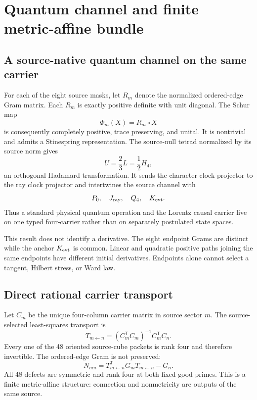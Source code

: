 \documentclass[11pt]{article}
\theoremstyle{definition}
\theoremstyle{remark}
\begin{document}
\section{Quantum channel and finite metric-affine bundle}

\subsection{A source-native quantum channel on the same carrier}

For each of the eight source masks, let $R_m$ denote the normalized ordered-edge Gram matrix. Each $R_m$ is exactly positive definite with unit diagonal. The Schur map
\begin{equation}\label{eq:schurchannel}
 \Phi_m(X)=R_m\circ X
\end{equation}
is consequently completely positive, trace preserving, and unital. It is nontrivial and admits a Stinespring representation. The source-null tetrad normalized by its source norm gives
\begin{equation}
 U=\frac23L=\frac12H_4,
\end{equation}
an orthogonal Hadamard transformation. It sends the character clock projector to the ray clock projector and intertwines the source channel with
\begin{equation}
 P_0,\quad J_{\rm ray},\quad Q_4,\quad K_{\rm evt}.
\end{equation}
Thus a standard physical quantum operation and the Lorentz causal carrier live on one typed four-carrier rather than on separately postulated state spaces.

This result does not identify a derivative. The eight endpoint Grams are distinct while the anchor $K_{\rm evt}$ is common. Linear and quadratic positive paths joining the same endpoints have different initial derivatives. Endpoints alone cannot select a tangent, Hilbert stress, or Ward law.

\subsection{Direct rational carrier transport}

Let $C_m$ be the unique four-column carrier matrix in source sector $m$. The source-selected least-squares transport is
\begin{equation}\label{eq:transport}
 T_{m\leftarrow n}=(C_m^{\mathsf T}C_m)^{-1}C_m^{\mathsf T}C_n.
\end{equation}
Every one of the 48 oriented source-cube packets is rank four and therefore invertible. The ordered-edge Gram is not preserved:
\begin{equation}\label{eq:finiteN}
 N_{mn}=T_{m\leftarrow n}^{\mathsf T}G_mT_{m\leftarrow n}-G_n.
\end{equation}
All 48 defects are symmetric and rank four at both fixed good primes. This is a finite metric-affine structure: connection and nonmetricity are outputs of the same source.
\end{document}

